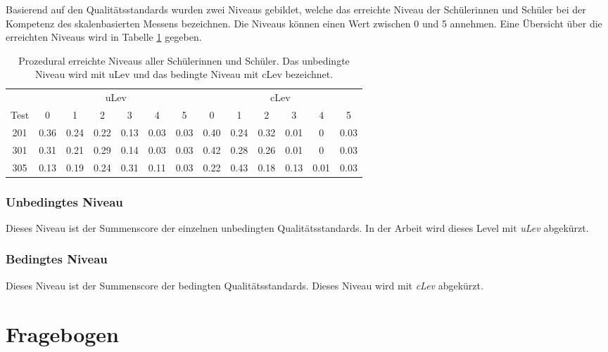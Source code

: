 Basierend auf den Qualitätsstandards wurden zwei Niveaus gebildet, welche das erreichte Niveau der Schülerinnen und Schüler bei der Kompetenz des skalenbasierten Messens bezeichnen. Die Niveaus können einen Wert zwischen 0 und 5 annehmen. Eine Übersicht über die erreichten Niveaus wird in Tabelle \ref{tab:Niveau} gegeben.
\begin{table}[!htbp]
  \centering
\begin{tabular}{c|cccccc|cccccc}
\toprule

  \multicolumn{1}{c}{} &  \multicolumn{6}{c}{uLev} &  \multicolumn{6}{c}{cLev}\\ 
 Test & 0 & 1 & 2 & 3 & 4 & 5 & 0 & 1 & 2 & 3 & 4 & 5\\ 
\midrule
 201 &   0.36 & 0.24 & 0.22 & 0.13 & 0.03 & 0.03 & 0.40 & 0.24 & 0.32  & 0.01 & 0 & 0.03   \\ 
 301 &   0.31 & 0.21 & 0.29 & 0.14 & 0.03 & 0.03  & 0.42 & 0.28 & 0.26 & 0.01 & 0 & 0.03  \\ 
 305 &   0.13 & 0.19 & 0.24 & 0.31 & 0.11 & 0.03  & 0.22 & 0.43 & 0.18 & 0.13 & 0.01 & 0.03 \\ 
\bottomrule
 
\end{tabular} 

  \caption{Prozedural erreichte Niveaus aller Schülerinnen und Schüler. Das unbedingte Niveau wird mit uLev und das bedingte Niveau mit cLev bezeichnet. }
  \label{tab:Niveau}
\end{table}

\subsubsection{Unbedingtes Niveau}
Dieses Niveau ist der Summenscore der einzelnen unbedingten Qualitätsstandards. In der Arbeit wird dieses Level mit \textit{uLev} abgekürzt.

\subsubsection{Bedingtes Niveau}

Dieses Niveau ist der Summenscore der bedingten Qualitätsstandards. Dieses Niveau wird mit \textit{cLev} abgekürzt.




\section{Fragebogen}

